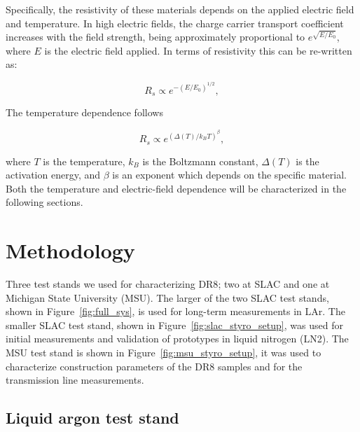 \documentclass[a4paper,12pt]{article}
\newcommand{\DR}{DR8}
\begin{document}
Specifically, the resistivity of these materials depends on the applied electric field and temperature.  
In high electric fields, the charge carrier transport coefficient increases with the field strength, being approximately proportional to $e^{\sqrt{E/E_0}}$, where $E$ is the electric field applied. 
In terms of resistivity this can be re-written as:

\begin{equation}
\label{eq:efield}
{R_s} \propto e^{- (E / E_0)^{1/2}},
\end{equation}

The temperature dependence follows

\begin{equation}
\label{eq:Tdep}
R_s \propto  e^{( \Delta(T) / k_B T)^{\beta}},
\end{equation}

where $T$ is the temperature, $k_B$ is the Boltzmann constant, $\Delta(T)$ is the activation energy, and $\beta$ is an exponent which depends on the specific material.
Both the temperature and electric-field dependence will be characterized in the following sections.  


\section{Methodology}
\label{sec:expsetup}

 
Three test stands we used for characterizing {\DR}; two at SLAC and one at Michigan State University (MSU).
The larger of the two SLAC test stands, shown in Figure~\ref{fig:full_sys}, is used for long-term measurements in LAr.    
The smaller SLAC test stand, shown in Figure~\ref{fig:slac_styro_setup}, was used for initial measurements and validation of prototypes in liquid nitrogen (LN2). 
The MSU test stand is shown in Figure~\ref{fig:msu_styro_setup}, it was used to characterize construction parameters of the {\DR} samples and for the transmission line measurements.  


\subsection{Liquid argon test stand}
\end{document}
